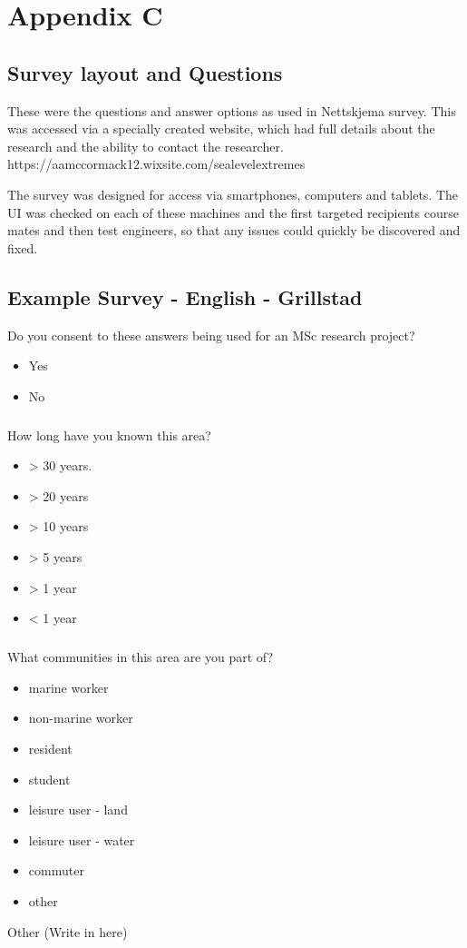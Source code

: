 \chapter{Appendix C} 

\section{Survey layout and Questions}
These were the questions and answer options as used in Nettskjema survey. This was accessed via a specially created website, which had full details about the research and the ability to contact the researcher. 
https://aamccormack12.wixsite.com/sealevelextremes 

The survey was designed for access via smartphones, computers and tablets. The UI was checked on each of these machines and the first targeted recipients course mates and then test engineers, so that any issues could quickly be discovered and fixed. 



\section{Example Survey - English - Grillstad}

Do you consent to these answers being used for an MSc research project?
\begin{itemize}
	\item Yes
    \item No
\end{itemize}

\newpage

\paragraph{}
How long have you known this area?
\begin{itemize}
	\item > 30 years.
    \item > 20 years
    \item > 10 years
    \item > 5 years
    \item > 1 year
    \item < 1 year
\end{itemize}

\paragraph{}
What communities in this area are you part of?
\begin{itemize}
    \item marine worker
    \item non-marine worker
    \item resident
    \item student
    \item leisure user - land
    \item leisure user - water
    \item commuter
    \item other 
\end{itemize}
Other (Write in here)
